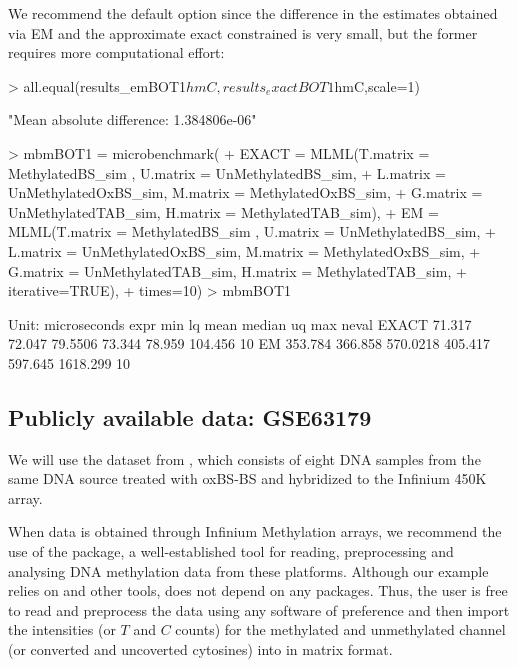 \documentclass{article}
\begin{document}
We recommend the default option  since the difference in the estimates obtained via EM and the approximate exact constrained is very small, but the former requires more computational effort:

\begin{Schunk}
\begin{Sinput}
>  all.equal(results_emBOT1$hmC,results_exactBOT1$hmC,scale=1)
\end{Sinput}
\begin{Soutput}
[1] "Mean absolute difference: 1.384806e-06"
\end{Soutput}
\end{Schunk}

\begin{Schunk}
\begin{Sinput}
>  mbmBOT1 = microbenchmark(
+     EXACT = MLML(T.matrix = MethylatedBS_sim , U.matrix = UnMethylatedBS_sim,
+                  L.matrix = UnMethylatedOxBS_sim, M.matrix = MethylatedOxBS_sim,
+                  G.matrix = UnMethylatedTAB_sim, H.matrix = MethylatedTAB_sim),
+     EM =    MLML(T.matrix = MethylatedBS_sim , U.matrix = UnMethylatedBS_sim,
+                  L.matrix = UnMethylatedOxBS_sim, M.matrix = MethylatedOxBS_sim,
+                  G.matrix = UnMethylatedTAB_sim, H.matrix = MethylatedTAB_sim,
+                  iterative=TRUE),
+     times=10)
>  mbmBOT1
\end{Sinput}
\begin{Soutput}
Unit: microseconds
  expr     min      lq     mean  median      uq      max neval
 EXACT  71.317  72.047  79.5506  73.344  78.959  104.456    10
    EM 353.784 366.858 570.0218 405.417 597.645 1618.299    10
\end{Soutput}
\end{Schunk}


\subsection{Publicly available data: GSE63179}

We will use the dataset from \cite{10.1371/journal.pone.0118202}, which consists of eight DNA samples from the same DNA source treated with oxBS-BS and hybridized to the Infinium 450K array.

When data is obtained through Infinium Methylation arrays, we recommend the use of the  package, a well-established tool for reading, preprocessing and analysing DNA methylation data from these platforms. Although our example relies on  and other \Bioconductor{} tools,  does not depend on any packages. Thus, the user is free to read and preprocess the data using any software of preference and then import the intensities (or $T$ and $C$ counts) for the methylated and unmethylated channel (or converted and uncoverted cytosines) into \R{} in matrix format.
\end{document}
